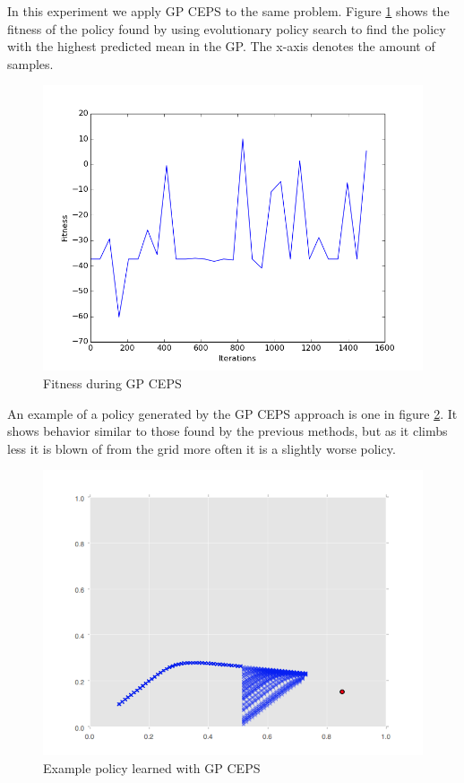 In this experiment we apply GP CEPS to the same problem. Figure \ref{Fitness during GP CEPS} shows the fitness of the policy found by using evolutionary policy search to find the policy with the highest predicted mean in the GP. The x-axis denotes the amount of samples. 

\begin{figure}[!htb]
  \centering
  \includegraphics[scale=0.5]{images/GPCEPS_True.png}
  \caption{Fitness during GP CEPS}\label{Fitness during GP CEPS}
\end{figure}

An example of a policy generated by the GP CEPS approach is one in figure \ref{gp_policy}. It shows behavior similar to those found by the previous methods, but as it climbs less it is blown of from the grid more often it is a slightly worse policy. 

\begin{figure}[!htb]
  \centering
  \includegraphics[scale=0.5]{images/GPCEPS_policy.png}
  \caption{Example policy learned with GP CEPS}\label{gp_policy}
\end{figure}

